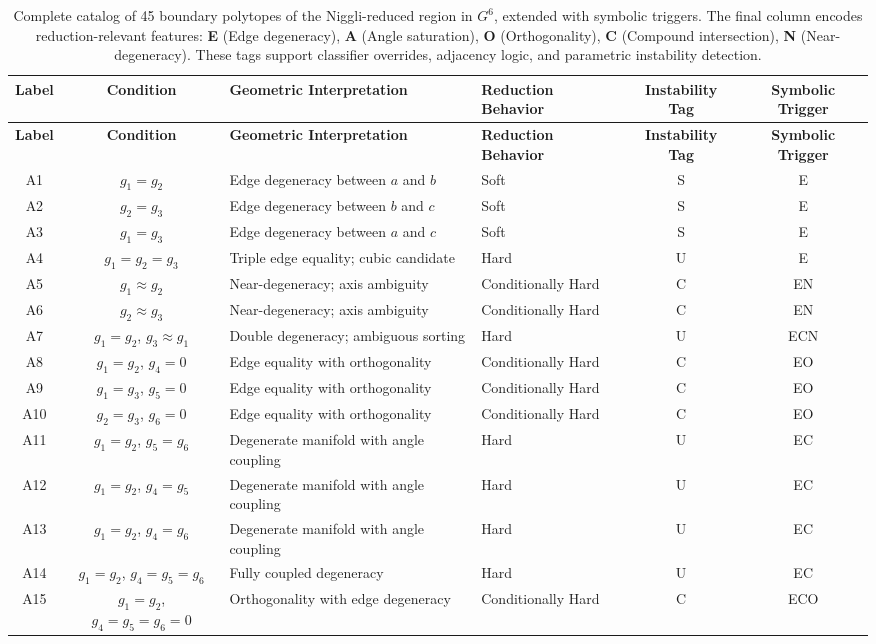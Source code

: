 \documentclass[preprint]{iucr}              %
\begin{document}
\begin{longtable}{|c|c|p{5.2cm}|p{3.8cm}|c|c|}
	\caption{Complete catalog of 45 boundary polytopes of the Niggli-reduced region in $G^6$, extended with symbolic triggers. The final column encodes reduction-relevant features: \textbf{E} (Edge degeneracy), \textbf{A} (Angle saturation), \textbf{O} (Orthogonality), \textbf{C} (Compound intersection), \textbf{N} (Near-degeneracy). These tags support classifier overrides, adjacency logic, and parametric instability detection.} \\
	\hline
	\textbf{Label} & \textbf{Condition} & \textbf{Geometric Interpretation} & \textbf{Reduction Behavior} & \textbf{Instability Tag} & \textbf{Symbolic Trigger} \\
	\hline
	\endfirsthead
	\hline
	\textbf{Label} & \textbf{Condition} & \textbf{Geometric Interpretation} & \textbf{Reduction Behavior} & \textbf{Instability Tag} & \textbf{Symbolic Trigger} \\
	\hline
	\endhead
	\hline
	\endfoot
	\hline
	\endlastfoot
	
	A1 & $g_1 = g_2$ & Edge degeneracy between $a$ and $b$ & Soft & S & E \\
	A2 & $g_2 = g_3$ & Edge degeneracy between $b$ and $c$ & Soft & S & E \\
	A3 & $g_1 = g_3$ & Edge degeneracy between $a$ and $c$ & Soft & S & E \\
	A4 & $g_1 = g_2 = g_3$ & Triple edge equality; cubic candidate & Hard & U & E \\
	A5 & $g_1 \approx g_2$ & Near-degeneracy; axis ambiguity & Conditionally Hard & C & EN \\
	A6 & $g_2 \approx g_3$ & Near-degeneracy; axis ambiguity & Conditionally Hard & C & EN \\
	A7 & $g_1 = g_2$, $g_3 \approx g_1$ & Double degeneracy; ambiguous sorting & Hard & U & ECN \\
	A8 & $g_1 = g_2$, $g_4 = 0$ & Edge equality with orthogonality & Conditionally Hard & C & EO \\
	A9 & $g_1 = g_3$, $g_5 = 0$ & Edge equality with orthogonality & Conditionally Hard & C & EO \\
	A10 & $g_2 = g_3$, $g_6 = 0$ & Edge equality with orthogonality & Conditionally Hard & C & EO \\
	A11 & $g_1 = g_2$, $g_5 = g_6$ & Degenerate manifold with angle coupling & Hard & U & EC \\
	A12 & $g_1 = g_2$, $g_4 = g_5$ & Degenerate manifold with angle coupling & Hard & U & EC \\
	A13 & $g_1 = g_2$, $g_4 = g_6$ & Degenerate manifold with angle coupling & Hard & U & EC \\
	A14 & $g_1 = g_2$, $g_4 = g_5 = g_6$ & Fully coupled degeneracy & Hard & U & EC \\
	A15 & $g_1 = g_2$, $g_4 = g_5 = g_6 = 0$ & Orthogonality with edge degeneracy & Conditionally Hard & C & ECO \\
	

\end{longtable}
\end{document}
